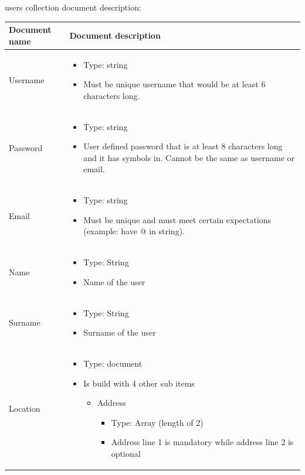 users collection document description:
\begin{center}
\begin{longtable}{ |m{4cm}|m{9cm}| } 
 \hline
  Document name & Document description \\ 
 \hline
  Username & 
  \begin{itemize}
    \item Type: string
    \item Must be unique username that would be at least 6 characters long.
  \end{itemize} \\ 
 \hline
  Password &   
  \begin{itemize}
    \item Type: string
    \item User defined password that is at least 8 characters long and it has symbols in. Cannot be the same as username or email.
  \end{itemize} \\
 \hline
  Email &   \begin{itemize}
    \item Type: string
    \item Must be unique and must meet certain expectations (example: have @ in string).
  \end{itemize} \\ 
 \hline
  Name &   \begin{itemize}
    \item Type: String
    \item Name of the user
  \end{itemize} \\
 \hline
  Surname &   
  \begin{itemize}
    \item Type: String
    \item Surname of the user
  \end{itemize} \\ 
 \hline
  Location &   
  \begin{itemize}
    \item Type: document
    \item Is build with 4 other sub items
        \begin{itemize}
            \item Address
                \begin{itemize}
                    \item Type: Array (length of 2)
                    \item Address line 1 is mandatory while address line 2 is optional

\end{itemize}
\end{itemize}
\end{itemize}
\end{longtable}
\end{center}
